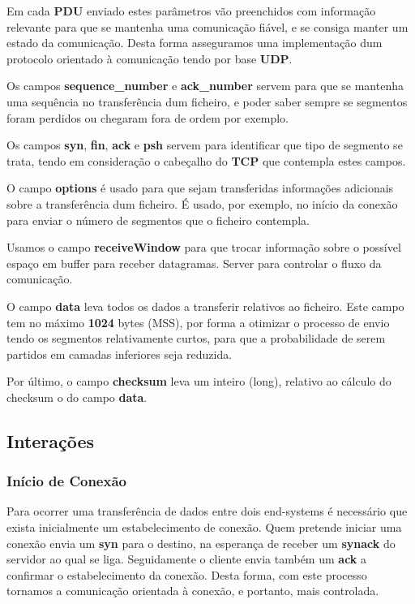 \documentclass{llncs}
\begin{document}
Em cada \textbf{PDU} enviado estes parâmetros vão preenchidos com informação relevante para que se mantenha uma comunicação fiável, e se consiga manter um estado da comunicação. Desta forma asseguramos uma implementação dum protocolo orientado à comunicação tendo por base \textbf{UDP}.

Os campos \textbf{sequence\_number} e \textbf{ack\_number} servem para que se mantenha uma sequência no transferência dum ficheiro, e poder saber sempre se segmentos foram perdidos ou chegaram fora de ordem por exemplo.

Os campos \textbf{syn}, \textbf{fin}, \textbf{ack} e \textbf{psh} servem para identificar que tipo de segmento se trata, tendo em consideração o cabeçalho do \textbf{TCP} que contempla estes campos.

O campo \textbf{options} é usado para que sejam transferidas informações adicionais sobre a transferência dum ficheiro. É usado, por exemplo, no início da conexão para enviar o número de segmentos que o ficheiro contempla.

Usamos o campo \textbf{receiveWindow} para que trocar informação sobre o possível espaço em buffer para receber datagramas. Server para controlar o fluxo da comunicação.

O campo \textbf{data} leva todos os dados a transferir relativos ao ficheiro. Este campo tem no máximo \textbf{1024} bytes (MSS), por forma a otimizar o processo de envio tendo os segmentos relativamente curtos, para que a probabilidade de serem partidos em camadas inferiores seja reduzida.

Por último, o campo \textbf{checksum} leva um inteiro (long), relativo ao cálculo do checksum o do campo \textbf{data}.


\subsection{Interações}

\subsubsection{Início de Conexão}

Para ocorrer uma transferência de dados entre dois end-systems é necessário que exista inicialmente um estabelecimento de conexão. Quem pretende iniciar uma conexão envia um \textbf{syn} para o destino, na esperança de receber um \textbf{synack} do servidor ao qual se liga. Seguidamente o cliente envia também um \textbf{ack} a confirmar o estabelecimento da conexão. Desta forma, com este processo tornamos a comunicação orientada à conexão, e portanto, mais controlada.
\end{document}
